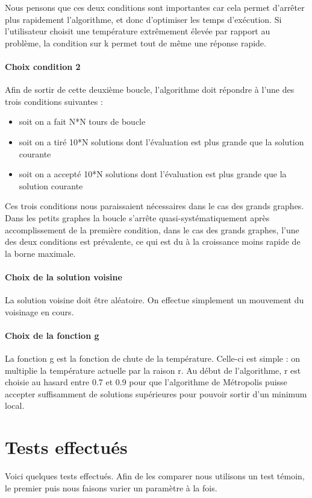 \documentclass[12pt]{article}
\begin{document}
Nous pensons que ces deux conditions sont importantes car cela permet d'arrêter plus rapidement l'algorithme, et donc d’optimiser les temps d’exécution. Si l’utilisateur choisit une température extrêmement élevée par rapport au problème, la condition sur k permet tout de même une réponse rapide.

\paragraph{Choix condition 2} Afin de sortir de cette deuxième boucle, l’algorithme doit répondre à l’une des trois conditions suivantes :
	\begin{itemize}
	\item soit on a fait N*N tours de boucle
	\item soit on a tiré 10*N solutions dont l’évaluation est plus grande que la solution courante
	\item soit on a accepté 10*N solutions dont l’évaluation est plus grande que la solution courante
	\end{itemize}
Ces trois conditions nous paraissaient nécessaires dans le cas des grands graphes. Dans les petits graphes la boucle s'arrête quasi-systématiquement après accomplissement de la première condition, dans le cas des grands graphes, l’une des deux conditions est prévalente, ce qui est du à la croissance moins rapide de la borne maximale.


\paragraph{Choix de la solution voisine} La solution voisine doit être aléatoire. On effectue simplement un mouvement du voisinage en cours.
\paragraph{Choix de la fonction g} La fonction g est la fonction de chute de la température. Celle-ci est simple : on multiplie la température actuelle par la raison r. Au début de l’algorithme, r est choisie au hasard entre 0.7 et 0.9 pour que l’algorithme de Métropolis puisse accepter suffisamment de solutions supérieures pour pouvoir sortir d’un minimum local. 

\section{Tests effectués}
Voici quelques tests effectués. Afin de les comparer nous utilisons un test témoin, le premier puis nous faisons varier un paramètre à la fois.
\end{document}
